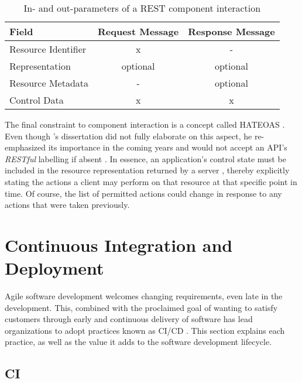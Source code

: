 \begin{appendices}
\begin{table}[hbt]
	\centering
  	\begin{tabular}{l|c|c}
	    Field & Request Message & Response Message \\
	    \hline
	    Resource Identifier 	& x & - \\
	    Representation 			& optional & optional \\
	    Resource Metadata 		& - & optional \\
	    Control Data 			& x & x \\
	\end{tabular}
  	\caption{In- and out-parameters of a \acs{REST} component interaction}
  	\label{tab:rest-message-fields}
\end{table}

The final constraint to component interaction is a concept called \ac{HATEOAS} \cite[p.~82]{fielding2000architectural}. Even though \citeauthor{fielding2000architectural}'s dissertation did not fully elaborate on this aspect, he re-emphasized its importance in the coming years and would not accept an \acs{API}'s \textit{\ac{REST}ful} labelling if absent \cite{fielding2008hypertext}. In essence, an application's control state must be included in the resource representation returned by a server \cite[p.~102]{fielding2000architectural}, thereby explicitly stating the actions a client may perform on that resource at that specific point in time. Of course, the list of permitted actions could change in response to any actions that were taken previously.


\section{Continuous Integration and Deployment}
\label{sec:continuous-integration-deployment}

Agile software development welcomes changing requirements, even late in the development. This, combined with the proclaimed goal of wanting to satisfy customers through early and continuous delivery of software has lead organizations to adopt practices known as \ac{CI/CD} \cite{beck2001manifesto} \cite[p.~22]{savor2016continuous} \cite[p.~78]{virmani2015understanding}. This section explains each practice, as well as the value it adds to the software development lifecycle.


\subsection{\acl{CI}}
\label{sec:continuous-integration}


\end{appendices}
